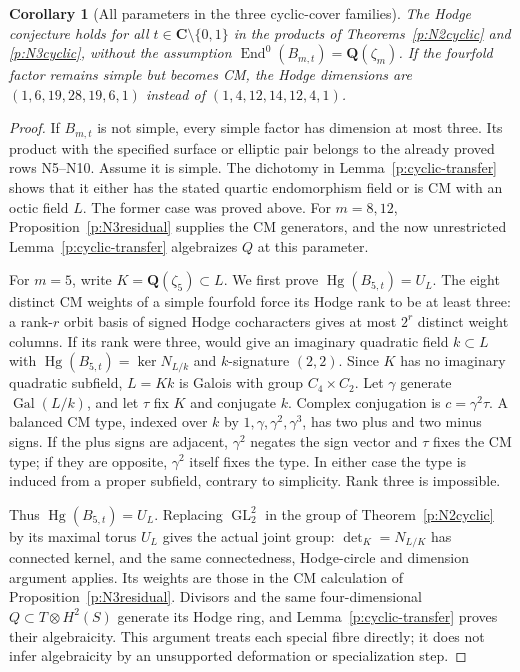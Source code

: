 \documentclass[10pt,reqno]{article}
\theoremstyle{emphasizedplain}
\newtheorem{corollary}[theorem]{Corollary}
\theoremstyle{emphasizeddefinition}
\theoremstyle{emphasizeddefinition}
\DeclareMathOperator{\End}{End}
\DeclareMathOperator{\Hg}{Hg}
\DeclareMathOperator{\GL}{GL}
\newcommand{\Q}{\mathbf Q}
\newcommand{\C}{\mathbf C}
\begin{document}
\begin{corollary}[All parameters in the three cyclic-cover families]
\label{p:cyclic-allparameters}
The Hodge conjecture holds for all $t\in\C\setminus\{0,1\}$
in the products of Theorems~\ref{p:N2cyclic} and
\ref{p:N3cyclic}, without the assumption
$\End^0(B_{m,t})=\Q(\zeta_m)$. If the fourfold factor remains
simple but becomes CM, the Hodge dimensions are
$(1,6,19,28,19,6,1)$ instead of $(1,4,12,14,12,4,1)$.
\end{corollary}
\begin{proof}
If $B_{m,t}$ is not simple, every simple factor has dimension at
most three. Its product with the specified surface or elliptic
pair belongs to the already proved rows N5--N10. Assume it is
simple. The dichotomy in Lemma~\ref{p:cyclic-transfer} shows
that it either has the stated quartic endomorphism field or is CM
with an octic field $L$. The former case was proved above.
For $m=8,12$, Proposition~\ref{p:N3residual} supplies the CM
generators, and the now unrestricted
Lemma~\ref{p:cyclic-transfer} algebraizes $Q$ at this parameter.

For $m=5$, write $K=\Q(\zeta_5)\subset L$. We first prove
$\Hg(B_{5,t})=U_L$. The eight distinct CM weights of a simple
fourfold force its Hodge rank to be at least three: a rank-$r$
orbit basis of signed Hodge cocharacters gives at most $2^r$
distinct weight columns. If its rank were three,
\cite[Lemma (3.7)]{MZ} would give an imaginary quadratic field
$k\subset L$ with $\Hg(B_{5,t})=\ker N_{L/k}$ and
$k$-signature $(2,2)$. Since $K$ has no imaginary quadratic
subfield, $L=Kk$ is Galois with group $C_4\times C_2$.
Let $\gamma$ generate $\operatorname{Gal}(L/k)$, and let $\tau$
fix $K$ and conjugate $k$. Complex conjugation is
$c=\gamma^2\tau$. A balanced CM type, indexed over $k$ by
$1,\gamma,\gamma^2,\gamma^3$, has two plus and two minus signs.
If the plus signs are adjacent, $\gamma^2$ negates the sign vector
and $\tau$ fixes the CM type; if they are opposite, $\gamma^2$
itself fixes the type. In either case the type is induced from a
proper subfield, contrary to simplicity. Rank three is impossible.

Thus $\Hg(B_{5,t})=U_L$. Replacing $\GL_2^2$ in the group of
Theorem~\ref{p:N2cyclic} by its maximal torus $U_L$ gives the
actual joint group: $\det_K=N_{L/K}$ has connected kernel, and
the same connectedness, Hodge-circle and dimension argument
applies. Its weights are those in the CM calculation of
Proposition~\ref{p:N3residual}. Divisors and the same four-dimensional
$Q\subset T\otimes H^2(S)$ generate its Hodge ring, and
Lemma~\ref{p:cyclic-transfer} proves their algebraicity. This
argument treats each special fibre directly; it does not infer
algebraicity by an unsupported deformation or specialization step.
\end{proof}
\end{document}
